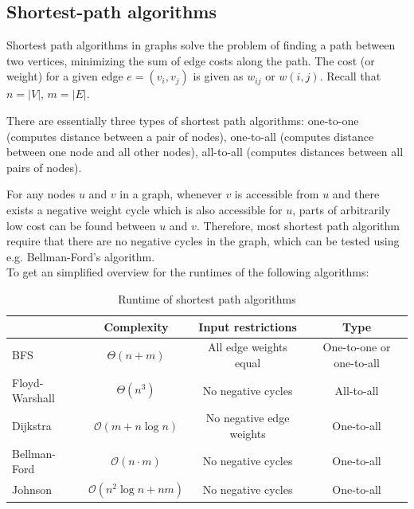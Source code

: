 \documentclass[a4paper]{article}
\begin{document}
\subsection{Shortest-path algorithms}


Shortest path algorithms in graphs solve the problem of finding a path between two vertices, minimizing the sum of edge costs along the path. The cost (or weight) for a given edge $e=(v_i, v_j)$ is given as $w_{ij}$ or $w(i,j)$. Recall that $n = \left\lvert V \right\rvert$, $m = \left\lvert E \right\rvert$.

There are essentially three types of shortest path algorithms: one-to-one (computes distance between a pair of nodes), one-to-all (computes distance between one node and all other nodes), all-to-all (computes distances between all pairs of nodes).

For any nodes $u$ and $v$ in a graph, whenever $v$ is accessible from $u$ and there exists a negative weight cycle which is also accessible for $u$, parts of arbitrarily low cost can be found between $u$ and $v$. Therefore, most shortest path algorithm require that there are no negative cycles in the graph, which can be tested using e.g. Bellman-Ford's algorithm. \\
To get an simplified overview for the runtimes of the following algorithms:
\begin{table}[h]
    \centering
    \begin{tabular}{| l| c | c | c|}
         \hline
            {}    &
        \textbf{Complexity} &
        \textbf{Input restrictions} & 
        \textbf{Type} \\
        
         \hline
         BFS &
         $\Theta(n+m)$&
         All edge weights equal &
         One-to-one or one-to-all\\
         
         Floyd-Warshall &
         $\Theta(n^3)$ &
         No negative cycles&
         All-to-all\\
         
         Dijkstra &
         $\mathcal{O}(m + n\log n)$&
         No negative edge weights&
         One-to-all\\
         
         Bellman-Ford &
         $\mathcal{O}(n\cdot m)$ &
         No negative cycles &
         One-to-all\\
         
         Johnson &
         $\mathcal{O}(n^2\log n + nm)$ &
         No negative cycles & 
         One-to-all\\
         
         \hline
    \end{tabular}
    \caption{Runtime of shortest path algorithms}
    \label{tab:shortest path algorithm runtime}
\end{table}
\newpage
\end{document}
